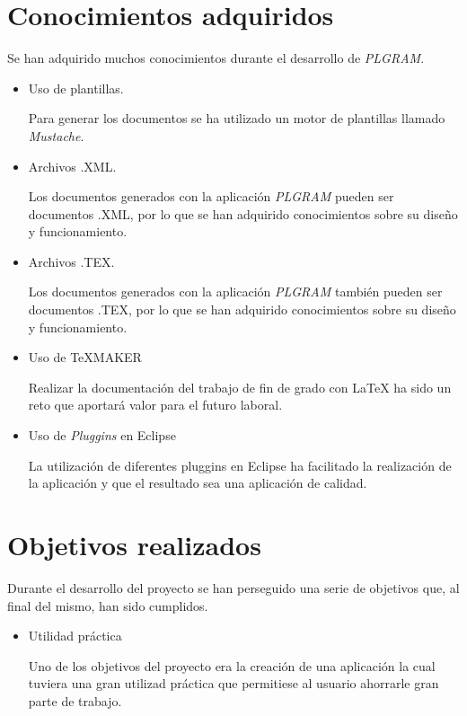 \section{Conocimientos adquiridos}
Se han adquirido muchos conocimientos durante el desarrollo de \textit{PLGRAM}.
\begin{itemize}
\item Uso de plantillas.

Para generar los documentos se ha utilizado un motor de  plantillas llamado \textit{Mustache}.
\item Archivos .XML.

Los documentos generados con la aplicación \textit{PLGRAM} pueden ser documentos .XML, por lo que se han adquirido conocimientos sobre su diseño y funcionamiento. 
\item Archivos .TEX.

Los documentos generados con la aplicación \textit{PLGRAM} también pueden ser documentos .TEX, por lo que se han adquirido conocimientos sobre su diseño y funcionamiento. 


\item Uso de \TeX{}MAKER

Realizar la documentación del trabajo de fin de grado con \LaTeX{} ha sido un reto que aportará valor para el futuro laboral.


\item Uso de \textit{Pluggins} en Eclipse

La utilización de diferentes pluggins en Eclipse ha facilitado la realización de la aplicación y que el resultado sea una aplicación de calidad.
\end{itemize}

\section{Objetivos realizados}
Durante el desarrollo del proyecto se han perseguido una serie de objetivos que, al final del mismo, han sido cumplidos.

\begin{itemize}
\item Utilidad práctica

Uno de los objetivos del proyecto era la creación de una aplicación la cual tuviera una gran utilizad práctica que permitiese al usuario ahorrarle gran parte de trabajo.
\end{itemize} 